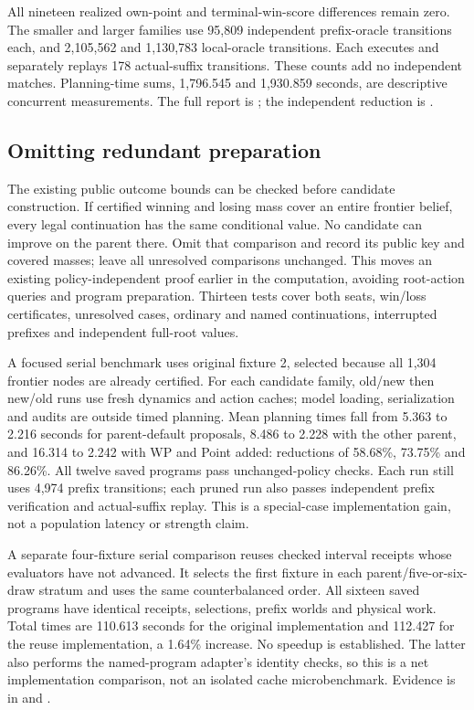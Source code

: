 All nineteen realized own-point and terminal-win-score differences remain zero.
The smaller and larger families use 95,809 independent prefix-oracle
transitions each, and 2,105,562 and 1,130,783 local-oracle transitions.
Each executes and separately replays 178 actual-suffix transitions. These
counts add no independent matches. Planning-time sums, 1,796.545 and
1,930.859 seconds, are descriptive concurrent measurements. The full report
is ; the independent reduction
is .

\subsection{Omitting redundant preparation}
The existing public outcome bounds can be checked before candidate
construction. If certified winning and losing mass cover an entire frontier
belief, every legal continuation has the same conditional value. No candidate
can improve on the parent there. Omit that comparison and record its public
key and covered masses; leave all unresolved comparisons unchanged. This
moves an existing policy-independent proof earlier in the computation,
avoiding root-action queries and program preparation. Thirteen tests cover
both seats, win/loss certificates, unresolved cases, ordinary and named
continuations, interrupted prefixes and independent full-root values.

A focused serial benchmark uses original fixture 2, selected because all
1,304 frontier nodes are already certified. For each candidate family, old/new
then new/old runs use fresh dynamics and action caches; model loading,
serialization and audits are outside timed planning. Mean planning times fall
from 5.363 to 2.216 seconds for parent-default proposals, 8.486 to 2.228 with
the other parent, and 16.314 to 2.242 with WP and Point added: reductions of
58.68\%, 73.75\% and 86.26\%. All twelve saved programs pass unchanged-policy
checks. Each run still uses 4,974 prefix transitions; each pruned run also
passes independent prefix verification and actual-suffix replay. This is a
special-case implementation gain, not a population latency or strength claim.

A separate four-fixture serial comparison reuses checked interval receipts
whose evaluators have not advanced. It selects the first fixture in each
parent/five-or-six-draw stratum and uses the same counterbalanced order.
All sixteen saved programs have identical receipts, selections, prefix
worlds and physical work. Total times are 110.613 seconds for the original
implementation and 112.427 for the reuse implementation, a 1.64\% increase.
No speedup is established. The latter also performs the named-program
adapter's identity checks, so this is a net implementation comparison,
not an isolated cache microbenchmark. Evidence is in
 and
.


